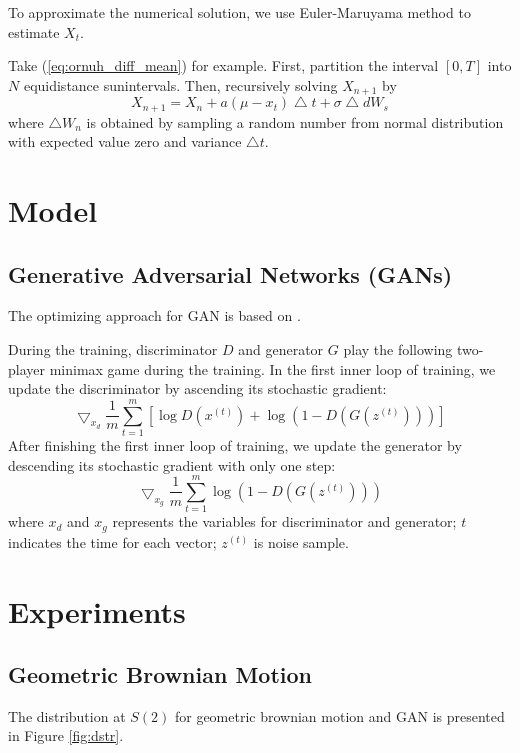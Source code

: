 \documentclass{article}
\begin{document}
	To approximate the numerical solution, we use Euler-Maruyama method to estimate $X_t$.
	
	Take (\ref{eq:ornuh_diff_mean}) for example. 
	First, partition the interval $[0,T]$ into $N$ equidistance sunintervals. 
	Then, recursively solving $X_{n+1}$ by
	\begin{equation}
		X_{n+1} = X_{n} + a (\mu-x_t) \bigtriangleup t+ \sigma \bigtriangleup dW_s
	\end{equation}
	where $\bigtriangleup W_n$ is obtained by sampling a random number from normal distribution with expected value zero and variance $\bigtriangleup t$.
	
	\section{Model}
	\subsection{Generative Adversarial Networks (GANs)}
	The optimizing approach for GAN is based on \cite{goodfellow}.
	
	
	 During the training, discriminator $D$ and generator $G$ play the following two-player minimax game during the training. 
	In the first inner loop of training, 
	we update the discriminator by ascending its stochastic gradient:
	\begin{equation}
		\bigtriangledown_{x_d} \frac{1}{m} \sum_{t=1}^{m} \left[ \log D(x^{\left(t\right)}) + \log \left(1-D\left(G\left(z^{(t)}\right)\right)\right)\right]
	\end{equation}
	After finishing the first inner loop of training, we update the generator by descending its stochastic gradient with only one step:
	\begin{equation}
		\bigtriangledown_{x_g} \frac{1}{m} \sum_{t=1}^{m} \log \left(1-D\left(G\left(z^{(t)}\right)\right)\right)
	\end{equation}
	where $x_d$ and $x_g$ represents the variables for discriminator and generator; $t$ indicates the time for each vector; $z^{(t)}$ is noise sample.
	
	\section{Experiments}
	\subsection{Geometric Brownian Motion}
	The distribution at $S(2)$ for geometric brownian motion and GAN is presented in Figure \ref{fig:dstr}.
	
\end{document}

